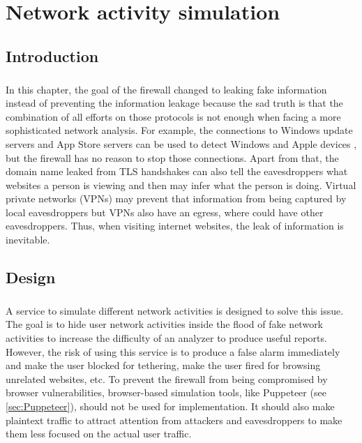 \documentclass[mscthesis]{usiinfthesis}
\begin{document}
\chapter{Network activity simulation}\label{cha:simulation}
\section{Introduction}
\paragraph{}
In this chapter, the goal of the firewall changed to leaking fake information instead of preventing the information leakage because the sad truth is that the combination of all efforts on those protocols is not enough when facing a more sophisticated network analysis. For example, the connections to Windows update servers and App Store servers can be used to detect Windows and Apple devices \citep{osandtether}, but the firewall has no reason to stop those connections. Apart from that, the domain name leaked from TLS handshakes can also tell the eavesdroppers what websites a person is viewing and then may infer what the person is doing. Virtual private networks (VPNs) may prevent that information from being captured by local eavesdroppers but VPNs also have an egress, where could have other eavesdroppers. Thus, when visiting internet websites, the leak of information is inevitable.

\section{Design}
\paragraph{}
A service to simulate different network activities is designed to solve this issue. The goal is to hide user network activities inside the flood of fake network activities to increase the difficulty of an analyzer to produce useful reports. However, the risk of using this service is to produce a false alarm immediately and make the user blocked for tethering, make the user fired for browsing unrelated websites, etc. To prevent the firewall from being compromised by browser vulnerabilities, browser-based simulation tools, like Puppeteer (see \cref{sec:Puppeteer}), should not be used for implementation. It should also make plaintext traffic to attract attention from attackers and eavesdroppers to make them less focused on the actual user traffic.
\end{document}
